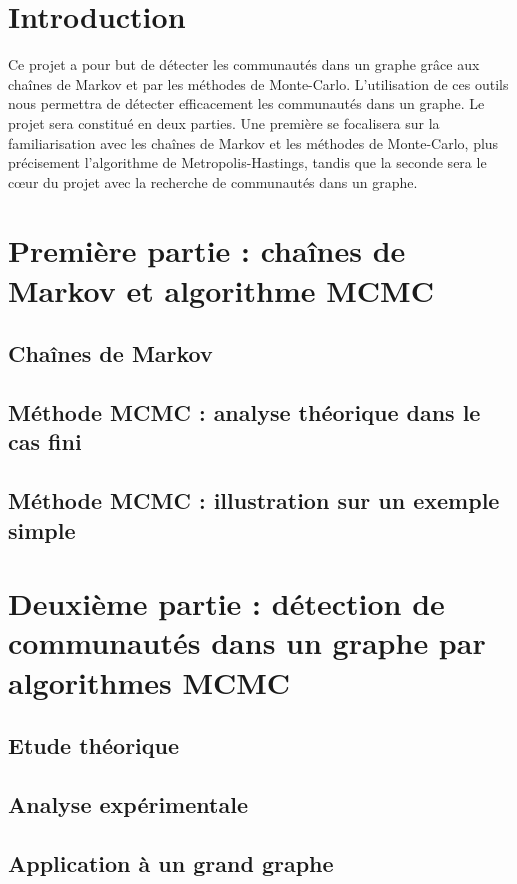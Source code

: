 \documentclass{article}
\begin{document}
\thispagestyle{empty}
\tableofcontents
\listoffigures
\pagebreak
\setcounter{page}{1}

\section*{Introduction}
Ce projet a pour but de détecter les communautés dans un graphe grâce aux chaînes de Markov et par les méthodes de Monte-Carlo. L'utilisation de ces outils nous permettra de détecter efficacement les communautés dans un graphe.
Le projet sera constitué en deux parties. Une première se focalisera sur la familiarisation avec les chaînes de Markov et les méthodes de Monte-Carlo, plus précisement l'algorithme de Metropolis-Hastings, tandis que la seconde sera le cœur du projet 
avec la recherche de communautés dans un graphe.

\section{Première partie : chaînes de Markov et algorithme MCMC}

\subsection{Chaînes de Markov}


\subsection{Méthode MCMC : analyse théorique dans le cas fini}


\subsection{Méthode MCMC : illustration sur un exemple simple}


\section{Deuxième partie : détection de communautés dans un graphe par algorithmes MCMC}

\subsection{Etude théorique}


\subsection{Analyse expérimentale}


\subsection{Application à un grand graphe}
\end{document}
